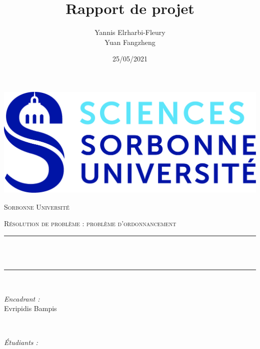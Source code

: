 \documentclass[12pt]{article}
\title{Rapport de projet}
\author{
Yannis Elrharbi-Fleury \\
Yuan Fangzheng
}
\date{25/05/2021}
\makeatletter
\let\thetitle\@title
\let\theauthor\@author
\makeatother
\begin{document}


\begin{titlepage}
	\centering
    \vspace*{0.5 cm}
   \includegraphics[scale = 0.075]{Images/logo_SU.jpeg}\\[1.0 cm]	%
\begin{center}    \textsc{\Large   Sorbonne Université}\\[2.0 cm]	\end{center}%
	\textsc{\Large Résolution de problème : problème d'ordonnancement}\\[0.5 cm]				%
	\rule{\linewidth}{0.2 mm} \\[0.4 cm]
	{ \huge \bfseries \thetitle}\\
	\rule{\linewidth}{0.2 mm} \\[1.5 cm]
	
	\begin{minipage}{0.4\textwidth}
		\begin{flushleft} \large
		\emph{Encadrant :}\\
		Evripidis Bampis\\
		\textbf{\Large }
			\end{flushleft}
			\end{minipage}~
			\begin{minipage}{0.4\textwidth}
            
			\begin{flushright} \large
			\emph{Étudiants :}\\
			\theauthor
		\end{flushright}
           
	\end{minipage}\\[2 cm]
	
\end{titlepage}
\end{document}
